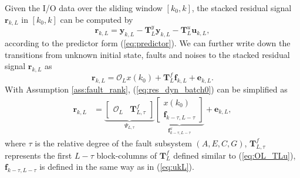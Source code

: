 \documentclass[twocolumn]{autart}
\begin{document}
Given the I/O data over the sliding window $\left[ k_0, k \right]$,
the stacked residual signal $\mathbf{r}_{k,L}$ in $\left[ k_0, k \right]$ can be computed by
\begin{equation}\label{eq:resL_compute}
\mathbf{r}_{k,L} = \mathbf{y}_{k,L} - \mathbf{T}_L^y \mathbf{y}_{k,L} - \mathbf{T}_L^u \mathbf{u}_{k,L},
\end{equation}
according to the predictor form (\ref{eq:predictor}).
We can further write down the transitions from unknown initial state, faults and noises to the stacked residual signal $\mathbf{r}_{k,L}$ as
\begin{equation}\label{eq:res_dyn_batch0}
\mathbf{r}_{k,L} = \mathcal{O}_{L} x(k_0) + \mathbf{T}_{L}^{f} \mathbf{f}_{k,L} + \mathbf{e}_{k,L}.
\end{equation}
With Assumption \ref{ass:fault_rank}, (\ref{eq:res_dyn_batch0}) can be simplified as
\begin{equation}\label{eq:res_dyn_batch}
\begin{aligned}
\mathbf{r}_{k,L}
&= \underbrace{\left[ \begin{array}{cc}
                        \mathcal{O}_{L} & \mathbf{T}_{L,\tau}^{f}
                      \end{array} \right]}_{\Psi_{L,\tau}} 
   \underbrace{\left[ \begin{array}{c}
                        x(k_0) \\
                        \mathbf{f}_{k-\tau,L-\tau}
                      \end{array} \right]}_{\mathbf{f}_{k-\tau,L-\tau}^x} + \mathbf{e}_{k,L},
\end{aligned}
\end{equation}
where $\tau$ is the relative degree of the fault subsystem $\left( A, E, C, G \right)$, $\mathbf{T}_{L,\tau}^{f}$ represents the first $L-\tau$ block-columns of $\mathbf{T}_{L}^{f}$ defined similar to (\ref{eq:OL_TLu}), $\mathbf{f}_{k-\tau,L-\tau}$ is defined in the same way as in (\ref{eq:ukL}).
\end{document}
